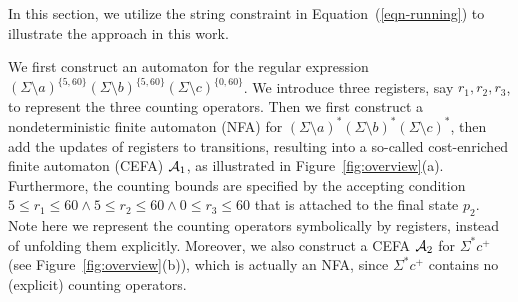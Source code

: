 
In this section, we utilize the string constraint in Equation~(\ref{eqn-running}) to illustrate the approach in this work.


We first construct an automaton for the regular expression $(\Sigma \setminus a)^{\{5, 60\}} (\Sigma \setminus b)^{\{5, 60\}} (\Sigma \setminus c)^{\{0, 60\}}$. We introduce three registers, say $r_1, r_2, r_3$, to represent the three counting operators.  
Then we first construct a nondeterministic finite automaton (NFA) for $(\Sigma \setminus a)^* (\Sigma \setminus b)^* (\Sigma \setminus c)^*$, then add the updates of registers to transitions, resulting into a so-called cost-enriched finite automaton (CEFA) $\mathcal{A}_1$,  as illustrated in Figure~\ref{fig:overview}(a). 
Furthermore, the counting bounds are specified by the accepting condition $5 \le r_1 \le 60 \wedge 5 \le r_2 \le 60 \wedge 0 \le r_3 \le 60$ that is attached to the final state $p_2$. Note here we represent the counting operators symbolically by registers, instead of unfolding them explicitly. Moreover, we also construct a CEFA $\mathcal{A}_2$ for $\Sigma^* c^+$ (see Figure~\ref{fig:overview}(b)), which is actually an NFA, since $\Sigma^* c^+$ contains no (explicit) counting operators. 


